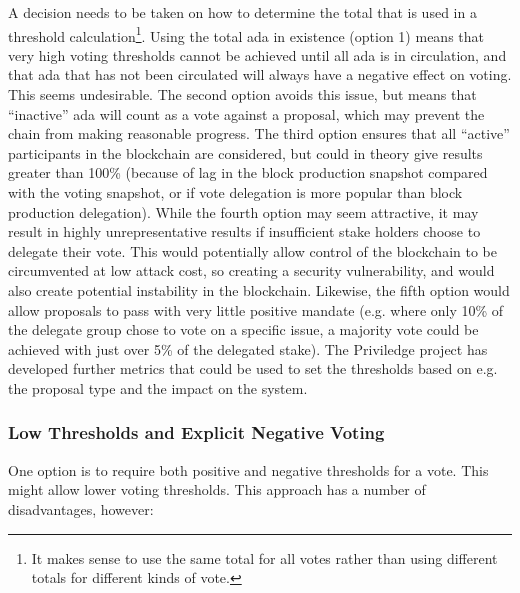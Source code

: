 A decision needs to be taken on how to determine the total that is used in a threshold calculation\footnote{It makes sense to use the same total for all votes rather than using different totals
  for different kinds of vote.}.
Using the total ada in existence (option 1) means that very high voting thresholds cannot be achieved until all ada
is in circulation, and that ada that has not been circulated will always have a negative effect on voting.
This seems undesirable.
The second option avoids this issue, but means that ``inactive'' ada will count as a vote against a proposal, which may prevent the chain from making reasonable progress.
The third option ensures that all ``active'' participants in the blockchain are considered, but could in theory give results greater than 100\% (because of lag in the
block production snapshot compared with the voting snapshot, or if vote delegation is more popular than block production delegation).
While the fourth option may seem attractive, it may result in highly unrepresentative results if insufficient stake holders choose to delegate their vote.  This would potentially allow control of the
blockchain to be circumvented at low attack cost, so creating a security vulnerability, and would also create potential instability in the blockchain.
Likewise, the fifth option would allow proposals to pass with very little positive mandate (e.g. where only 10\% of the delegate group chose to vote on a specific issue, a majority vote could be
achieved with just over 5\% of the delegated stake).
The Priviledge project has developed further metrics that could be used to set the thresholds based on e.g. the proposal type and the
impact on the system.

\subsubsection*{Low Thresholds and Explicit Negative Voting}

One option is to require both positive and negative thresholds for a vote.  This might allow lower voting thresholds.
This approach has a number of disadvantages, however:

